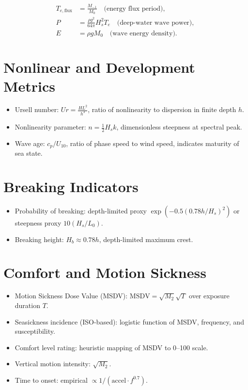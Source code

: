 \documentclass[11pt]{article}
\begin{document}
\begin{align}
T_{e,\text{flux}} &= \frac{M_{-1}}{M_0} \quad \text{(energy flux period)}, \\
P &= \frac{\rho g^2}{64\pi} H_s^2 T_e \quad \text{(deep-water wave power)}, \\
E &= \rho g M_0 \quad \text{(wave energy density)}.
\end{align}

\section{Nonlinear and Development Metrics}

\begin{itemize}
  \item Ursell number: $Ur = \tfrac{H L^2}{h^3}$, ratio of nonlinearity to dispersion in finite depth $h$.
  \item Nonlinearity parameter: $n = \tfrac{1}{2}H_s k$, dimensionless steepness at spectral peak.
  \item Wave age: $c_p/U_{10}$, ratio of phase speed to wind speed, indicates maturity of sea state.
\end{itemize}

\section{Breaking Indicators}

\begin{itemize}
  \item Probability of breaking: depth-limited proxy $\exp(-0.5(0.78h/H_s)^2)$ or steepness proxy $10(H_s/L_0)$.
  \item Breaking height: $H_b \approx 0.78 h$, depth-limited maximum crest.
\end{itemize}

\section{Comfort and Motion Sickness}

\begin{itemize}
  \item Motion Sickness Dose Value (MSDV):  
  $\text{MSDV} = \sqrt{M_2}\sqrt{T}$ over exposure duration $T$.
  \item Seasickness incidence (ISO-based): logistic function of MSDV, frequency, and susceptibility.
  \item Comfort level rating: heuristic mapping of MSDV to 0–100 scale.
  \item Vertical motion intensity: $\sqrt{M_2}$.
  \item Time to onset: empirical $\propto 1/(\text{accel} \cdot f^{0.7})$.
\end{itemize}
\end{document}
